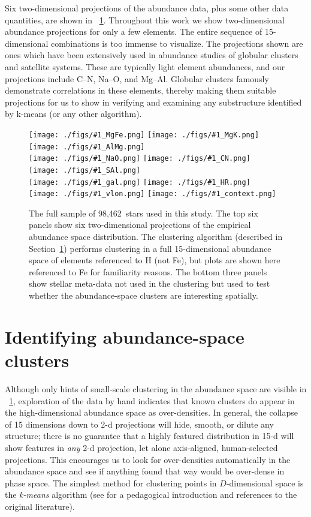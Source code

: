 \documentclass[12pt, letterpaper, preprint]{aastex}
\newcommand{\sectionname}{Section}
\newcommand{\insanefigure}[1]{%
\texttt{[image: ./figs/\#1\_MgFe.png]}%
\texttt{[image: ./figs/\#1\_MgK.png]}%
\texttt{[image: ./figs/\#1\_AlMg.png]}\\
\texttt{[image: ./figs/\#1\_NaO.png]}%
\texttt{[image: ./figs/\#1\_CN.png]}%
\texttt{[image: ./figs/\#1\_SAl.png]}\\
\texttt{[image: ./figs/\#1\_gal.png]}%
\texttt{[image: ./figs/\#1\_HR.png]}\\
\texttt{[image: ./figs/\#1\_vlon.png]}%
\texttt{[image: ./figs/\#1\_context.png]}}
\newcommand{\totalnumber}{98,462}
\begin{document}
Six two-dimensional projections of the abundance data, plus some other
data quantities, are shown in \figurename~\ref{fig:all}.  Throughout
this work we show two-dimensional abundance projections for only a few
elements. The entire sequence of 15-dimensional combinations is too
immense to visualize. The projections shown are ones which
have been extensively used in abundance studies of globular clusters
and satellite systems. These are typically light element abundances,
and our projections include C--N, Na--O, and Mg--Al. Globular clusters
famously demonstrate correlations in these elements, thereby making
them suitable projections for us to show in verifying and examining
any substructure identified by k-means (or any other algorithm).

\begin{figure}[!p]
\insanefigure{all}
\caption{The full sample of \totalnumber\ stars used in this study.
  The top six panels show six two-dimensional projections of the
  empirical abundance space distribution.
  The clustering algorithm (described in
  \sectionname~\ref{sec:method}) performs clustering in a full
  15-dimensional abundance space of elements referenced to H (not Fe),
  but plots are shown here referenced to Fe for familiarity reasons.
  The bottom three panels show stellar meta-data not used in the
  clustering but used to test whether the abundance-space clusters
  are interesting spatially.\label{fig:all}}
\end{figure}

\clearpage
\section{Identifying abundance-space clusters}\label{sec:method}

Although only hints of small-scale clustering in the abundance space
are visible in \figurename~\ref{fig:all}, exploration of the data by hand indicates that
known clusters do appear in the high-dimensional abundance space as over-densities.
In general, the collapse of 15 dimensions down to 2-d projections
will hide, smooth, or dilute any structure; there is no guarantee that
a highly featured distribution in 15-d will show features in
\emph{any} 2-d projection, let alone axis-aligned, human-selected projections.
This encourages us to look for over-densities automatically in the
abundance space and see if anything found that way would be over-dense
in phase space.
The simplest method for clustering points in $D$-dimensional space is
the \emph{k-means} algorithm (see \citealt{bishop} for a pedagogical
introduction and references to the original literature).
\end{document}
